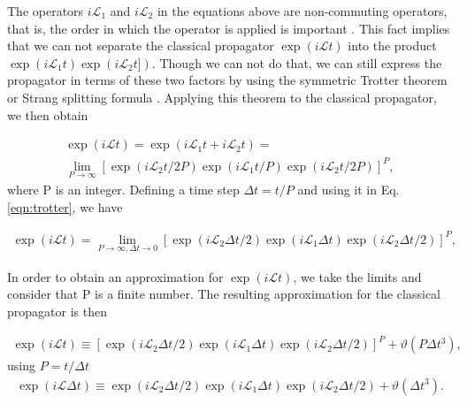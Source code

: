 The operators $i\mathcal{L}_{1}$ and $i\mathcal{L}_{2}$ in the equations above are non-commuting operators, that is, the order in which the operator is applied is important \cite{tuckerman}. This fact implies that we can not separate the classical propagator $\exp (i\mathcal{L}t)$  into the product $\exp (i\mathcal{L}_{1}t) \exp (i\mathcal{L}_{2}t])$. Though we can not do that, we can still express the propagator in terms of these two factors by using the symmetric Trotter theorem or Strang splitting formula \cite{trotter,strang}. Applying this theorem to the classical propagator, we then obtain

\begin{equation}
\begin{aligned}
\exp (i\mathcal{L}t)  = \exp (i\mathcal{L}_{1}t + i\mathcal{L}_{2}t) = \\
\lim\limits_{P \rightarrow \infty} \left [ \exp (i\mathcal{L}_{2}t/2P) \exp (i\mathcal{L}_{1}t/P) \exp (i\mathcal{L}_{2}t/2P) \right ]^{P},
\end{aligned}
\label{eqn:trotter}
\end{equation}
where P is an integer. Defining a time step $\Delta t =t/P$ and using it in Eq. \ref{eqn:trotter}, we have

\begin{equation}
\begin{aligned}
\exp (i\mathcal{L}t)  = 
\lim\limits_{P \rightarrow \infty, \Delta t \rightarrow 0} \left [ \exp (i\mathcal{L}_{2} \Delta t/2) \exp (i\mathcal{L}_{1} \Delta t) \exp (i\mathcal{L}_{2} \Delta t/2) \right ]^{P},
\end{aligned}
\label{eqn:trotterdt}
\end{equation}

In order to obtain an approximation for $\exp (i\mathcal{L}t)$, we take the limits and consider that P is a finite number. The resulting approximation for the classical propagator is then 

\begin{equation}
\begin{aligned}
\exp (i\mathcal{L}t)  \equiv
\left [ \exp (i\mathcal{L}_{2} \Delta t/2) \exp (i\mathcal{L}_{1} \Delta t) \exp (i\mathcal{L}_{2} \Delta t/2) \right ]^{P} + \vartheta (P \Delta t^{3}),
\end{aligned}
\end{equation}
using $P= t/\Delta t$
\begin{equation}
\begin{aligned}
\exp (i\mathcal{L} \Delta t)  \equiv
\exp (i\mathcal{L}_{2} \Delta t/2) \exp (i\mathcal{L}_{1} \Delta t) \exp (i\mathcal{L}_{2} \Delta t/2)  + \vartheta (\Delta t^{3}).
\end{aligned}
\label{eqn:trotterfin}
\end{equation}  

